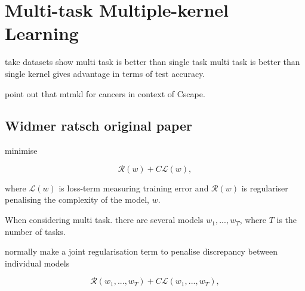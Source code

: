 \section{Multi-task Multiple-kernel Learning}

take datasets show multi task is better than single task
multi task is better than single kernel
gives advantage in terms of test accuracy.

point out that mtmkl for cancers in context of Cscape.



\subsection{Widmer ratsch original paper}

minimise

\begin{equation}
	\mathcal{R}(w) + C \mathcal{L}(w),
\end{equation}

where \(\mathcal{L}(w)\) is loss-term measuring training error and
\(\mathcal{R}(w)\) is regulariser penalising the complexity of the model, \(w\).

When considering multi task. there are several models \(w_1,...,w_T\), where \(T\) is the number of tasks.

normally make a joint regularisation term to penalise discrepancy between individual models

\begin{equation}
	\mathcal{R}(w_1,...,w_T) + C \mathcal{L}(w_1,...,w_T),
\end{equation}